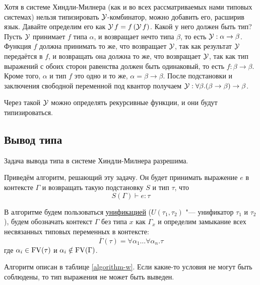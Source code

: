 Хотя в системе Хиндли-Милнера (как и во всех рассматриваемых нами типовых системах) нельзя типизировать $\operatorname{\mathcal{Y}}$-комбинатор,
можно добавить его, расширив язык.
Давайте определим его как $\operatorname{\mathcal{Y}} f = f \left(\operatorname{\mathcal{Y}} f\right)$.
Какой у него должен быть тип? Пусть $\operatorname{\mathcal{Y}}$ принимает $f$ типа $\alpha$, и возвращает нечто типа $\beta$,
то есть $\operatorname{\mathcal{Y}} : \alpha\to\beta$.
Функция $f$ должна принимать то же, что возвращает $\operatorname{\mathcal{Y}}$, так как результат $\operatorname{\mathcal{Y}}$ передаётся в $f$,
и возвращать она должна то же, что возвращает $\operatorname{\mathcal{Y}}$, так как тип выражений с обоих сторон равенства должен быть одинаковый,
то есть $f : \beta\to\beta$.
Кроме того, $\alpha$ и тип $f$ это одно и то же, $\alpha=\beta\to\beta$.
После подстановки и заключения свободной переменной под квантор получаем $\operatorname{\mathcal{Y}} : \forall\beta.(\beta\to\beta)\to\beta$.

Через такой $\operatorname{\mathcal{Y}}$ можно определять рекурсивные функции, и они будут типизироваться.

\subsection{\texorpdfstring{Вывод типа}{Type inference}}
\begin{statement}
    Задача вывода типа в системе Хиндли-Милнера разрешима.
\end{statement}
Приведём алгоритм, решающий эту задачу.
Он будет принимать выражение $e$ в контексте $\Gamma$ и возвращать такую подстановку $S$ и тип $\tau$, что
\[
    S(\Gamma) \vdash e : \tau
\]

В алгоритме будем пользоваться \hyperref[unificator]{унификацией} ($U(\tau_1, \tau_2)$ "--- унификатор $\tau_1$ и $\tau_2$),
будем обозначать контекст $\Gamma$ без типа $x$ как $\Gamma_x$
и определим замыкание всех несвязанных типовых переменных в контексте:
\[
    \overline{\Gamma}(\tau) = \forall \alpha_1 \ldots \forall \alpha_n . \tau
\]
где $\alpha_i \in \operatorname{FV}(\tau)$ и $\alpha_i \notin \operatorname{FV}(\Gamma)$.

Алгоритм описан в таблице \ref{algorithm-w}.
Если какие-то условия не могут быть соблюдены, то тип выражения не может быть выведен.

